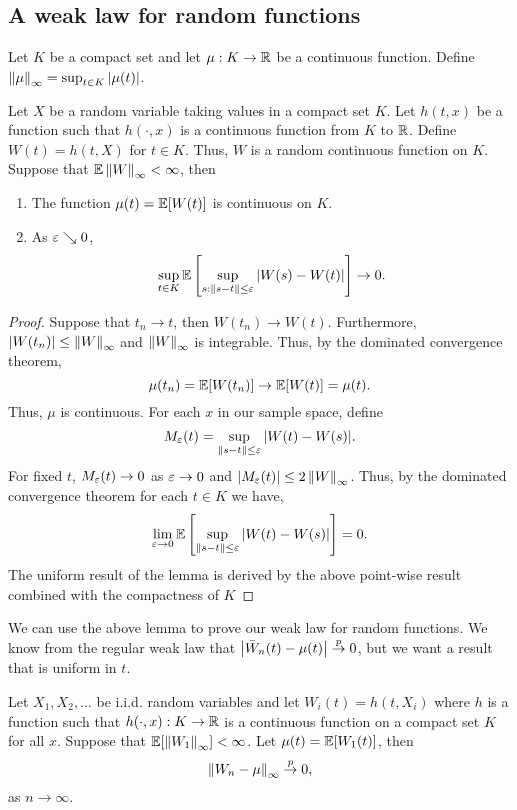\subsection{A weak law for random functions}
\begin{definition}
    Let $K$ be a compact set and let $\mu : K  \to {\mathbb R}$ be a continuous function. Define $\left\|\mu\right\|_\infty = \sup_{t \in K} {\left\lvert\mu(t)\right\rvert}$.
\end{definition}
\begin{lemma}
    Let $X$ be a random variable taking values in a compact set $K$. Let $h(t,x)$ be a function such that $h(\cdot, x)$ is a continuous function from $K$ to ${\mathbb R}$. Define $W(t) = h(t,X)$ for $t \in K$. Thus, $W$ is a random continuous function on $K$. Suppose that ${\mathbb{E}}\left\|W\right\|_\infty < \infty$, then
    \begin{enumerate}
        \item The function $\mu(t) = {\mathbb{E}}[W(t)]$ is continuous on $K$.
        \item As $\varepsilon \searrow 0$,
        \[ \sup_{t \in K} {\mathbb{E}}\left[\sup_{s : \left\|s-t\right\| \le \varepsilon} {\left\lvert W(s)-W(t)\right\rvert}\right] \to 0. \]
    \end{enumerate}
\end{lemma} 
\begin{proof}
    Suppose that $t_n \to t$, then $W(t_n) \to W(t)$. Furthermore, ${\left\lvert W(t_n)\right\rvert} \le \left\|W\right\|_\infty$ and $\left\|W\right\|_\infty$ is integrable. Thus, by the dominated convergence theorem,
    \[\mu(t_n)={\mathbb{E}}[W(t_n)] \to {\mathbb{E}}[W(t)] = \mu(t).  \]
    Thus, $\mu$ is continuous. For each $x$ in our sample space, define
    \[M_\varepsilon(t) = \sup_{\left\|s-t\right\|\le \varepsilon}{\left\lvert W(t) - W(s)\right\rvert}. \]
    For fixed $t$, $M_\varepsilon(t) \to 0$ as $\varepsilon \to 0$ and ${\left\lvert M_\varepsilon(t)\right\rvert}\le 2\left\|W\right\|_\infty$. Thus, by the dominated convergence theorem for each $t \in K$ we have,
    \[\lim_{\varepsilon \to 0} {\mathbb{E}}\left[ \sup_{\left\|s-t\right\|\le \varepsilon}{\left\lvert W(t) - W(s)\right\rvert}\right] = 0. \]
    The uniform result of the lemma is derived by the above point-wise result combined with the compactness of $K$
\end{proof}
We can use the above lemma to prove our weak law for random functions. We know from the regular weak law that ${\left\lvert\bar{W}_n(t) - \mu(t)\right\rvert} \stackrel{p}{\to} 0$, but we want a result that is uniform in $t$. 
\begin{theorem}
    Let $X_1,X_2,\ldots$ be i.i.d. random variables and let $W_i(t)=h(t,X_i)$ where $h$ is a function such that $h(\cdot,x):K \to {\mathbb R}$ is a continuous function on a compact set $K$ for all $x$. Suppose that ${\mathbb{E}}[\left\|W_1\right\|_\infty] < \infty$. Let $\mu(t) = {\mathbb{E}}[W_1(t)]$, then
    \[\left\|W_n - \mu\right\|_\infty \stackrel{p}{\to} 0, \]
    as $n \to \infty$.  
\end{theorem}
